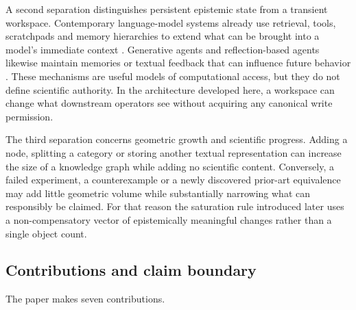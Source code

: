 \documentclass[11pt]{article}
\begin{document}
A second separation distinguishes persistent epistemic state from a transient workspace. Contemporary language-model systems already use retrieval, tools, scratchpads and memory hierarchies to extend what can be brought into a model's immediate context \cite{lewis2020,yao2023,schick2023,packer2023,mialon2023}. Generative agents and reflection-based agents likewise maintain memories or textual feedback that can influence future behavior \cite{park2023,shinn2023}. These mechanisms are useful models of computational access, but they do not define scientific authority. In the architecture developed here, a workspace can change what downstream operators see without acquiring any canonical write permission.

The third separation concerns geometric growth and scientific progress. Adding a node, splitting a category or storing another textual representation can increase the size of a knowledge graph while adding no scientific content. Conversely, a failed experiment, a counterexample or a newly discovered prior-art equivalence may add little geometric volume while substantially narrowing what can responsibly be claimed. For that reason the saturation rule introduced later uses a non-compensatory vector of epistemically meaningful changes rather than a single object count.

\subsection{Contributions and claim boundary}

The paper makes seven contributions.
\end{document}
